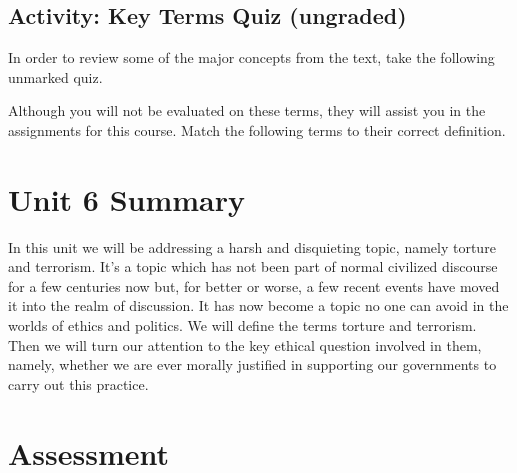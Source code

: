 \documentclass[
]{book}
\begin{document}
\hypertarget{activity-key-terms-quiz-ungraded-5}{%
\subsection*{Activity: Key Terms Quiz (ungraded)}\label{activity-key-terms-quiz-ungraded-5}}

\begin{reflect}
In order to review some of the major concepts from the text, take the following unmarked quiz.

Although you will not be evaluated on these terms, they will assist you in the assignments for this course. Match the following terms to their correct definition.
\end{reflect}

\hypertarget{unit-6-summary}{%
\section*{Unit 6 Summary}\label{unit-6-summary}}

In this unit we will be addressing a harsh and disquieting topic, namely torture and terrorism. It's a topic which has not been part of normal civilized discourse for a few centuries now but, for better or worse, a few recent events have moved it into the realm of discussion. It has now become a topic no one can avoid in the worlds of ethics and politics. We will define the terms torture and terrorism. Then we will turn our attention to the key ethical question involved in them, namely, whether we are ever morally justified in supporting our governments to carry out this practice.

\hypertarget{assessment-11}{%
\section*{Assessment}\label{assessment-11}}
\end{document}
